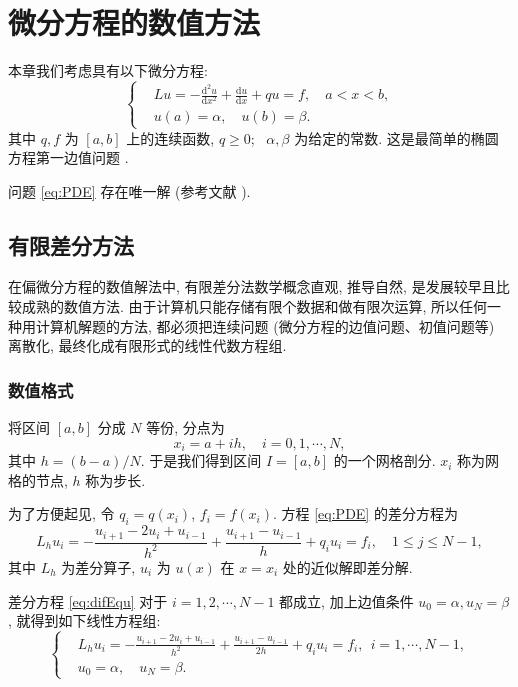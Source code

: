 

\chapter{微分方程的数值方法}

本章我们考虑具有以下微分方程:
\begin{equation}\label{eq:PDE}
\left\{\begin{aligned}
& L u=-\frac{\mathrm{d}^{2} u}{\mathrm{d} x^{2}}+\frac{\mathrm{d} u}{\mathrm{d} x}+q u=f, \quad a < x < b, \\
& u(a)=\alpha, \quad u(b)=\beta.
\end{aligned}\right.
\end{equation}
其中 $q, f$ 为 $[a,b]$ 上的连续函数, $q \geqslant 0$;~ $\alpha, \beta$ 为给定的常数. 这是最简单的椭圆方程第一边值问题 .

问题 \eqref{eq:PDE} 存在唯一解 (参考文献 \cite{LiLiu1997}).


\section{有限差分方法}
在偏微分方程的数值解法中, 有限差分法数学概念直观, 推导自然, 是发展较早且比较成熟的数值方法. 由于计算机只能存储有限个数据和做有限次运算, 所以任何一种用计算机解题的方法, 都必须把连续问题 (微分方程的边值问题、初值问题等) 离散化, 最终化成有限形式的线性代数方程组.

\subsection{数值格式}
将区间 $[a,b]$ 分成 $N$ 等份, 分点为
\begin{equation*}
  x_{i} = a+ih, \quad i=0,1, \cdots, N,
\end{equation*}
其中 $h=(b-a)/N$. 于是我们得到区间 $I=[a,b]$ 的一个网格剖分. $x_i$ 称为网格的节点, $h$ 称为步长.

为了方便起见, 令 $q_{i}=q(x_{i})$, $f_{i}=f(x_{i})$. 方程 \eqref{eq:PDE} 的差分方程为
\begin{equation}\label{eq:difEqu}
  L_{h} u_{i}=-\frac{u_{i+1}-2 u_{i}+u_{i-1}}{h^{2}}+\frac{u_{i+1}-u_{i-1}}{h}+q_{i} u_{i}=f_{i},\quad 1 \leqslant j \leqslant N-1,
\end{equation}
其中 $L_{h}$ 为差分算子, $u_i$ 为 $u(x)$ 在 $x=x_i$ 处的近似解即差分解.

差分方程 \eqref{eq:difEqu} 对于 $i=1,2, \cdots, N-1$ 都成立, 加上边值条件 $u_{0}=\alpha, u_{N}=\beta$, 就得到如下线性方程组:
\begin{equation}\label{eq:fdm}
\left\{\begin{aligned}
& L_{h} u_{i}=-\frac{u_{i+1}-2 u_{i}+u_{i-1}}{h^{2}}+\frac{u_{i+1}-u_{i-1}}{2h}+q_{i} u_{i}=f_{i}, ~~ i=1, \cdots, N-1, \\
& u_{0}=\alpha, \quad u_{N}=\beta.
\end{aligned}\right.
\end{equation}

